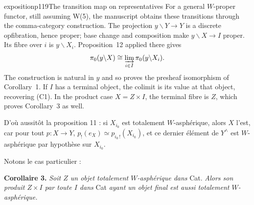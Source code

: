 \begin{dcomment}{exposition}{p119}{The transition map on representatives}
For a general $W$-proper functor, still assuming W(5), the manuscript obtains these transitions through the comma-category construction. The projection $y\backslash Y\to Y$ is a discrete opfibration, hence proper; base change and composition make $y\backslash X\to I$ proper. Its fibre over $i$ is $y\backslash X_i$. Proposition~12 applied there gives
\[
 \pi_0(y\backslash X)
   \cong\varinjlim_{i\in I}\pi_0(y\backslash X_i).
\]
The construction is natural in $y$ and so proves the presheaf isomorphism of Corollary~1. If $I$ has a terminal object, the colimit is its value at that object, recovering (C1). In the product case $X=Z\times I$, the terminal fibre is $Z$, which proves Corollary~3 as well.
\end{dcomment}


D'où aussitôt la proposition 11 : si $X_{i_0}$ est totalement $W$-asphérique, alors $X$ l'est, car pour tout $p : X \longrightarrow Y$, $p_!(e_X) \simeq p_{i_0\,!}(X_{i_0})$, et ce dernier élément de $Y^\wedge$ est $W$-asphérique %
par hypothèse sur $X_{i_0}$.

Notons le cas particulier :

\textbf{Corollaire 3.} \textit{Soit $Z$ un objet totalement $W$-asphérique dans} Cat. \textit{Alors son produit $Z\times I$ par toute $I$ dans} Cat \textit{ayant un objet final est aussi totalement $W$-asphérique.}

